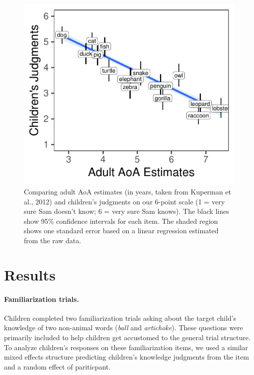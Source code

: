 \documentclass[10pt, letterpaper]{article}
\newenvironment{CodeChunk}{}{}
\begin{document}
\begin{CodeChunk}
\begin{figure}[tb]
\includegraphics{figs/overall-1} \caption[Comparing adult AoA estimates (in years, taken from Kuperman et al., 2012) and children’s judgments on our 6-point scale (1 = very sure Sam doesn’t know]{Comparing adult AoA estimates (in years, taken from Kuperman et al., 2012) and children’s judgments on our 6-point scale (1 = very sure Sam doesn’t know; 6 = very sure Sam knows). The black lines show 95\% confidence intervals for each item. The shaded region shows one standard error based on a linear regression estimated from the raw data.}\label{fig:overall}
\end{figure}
\end{CodeChunk}

\hypertarget{results}{%
\section{Results}\label{results}}

\hypertarget{familiarization-trials.}{%
\paragraph{Familiarization trials.}\label{familiarization-trials.}}

Children completed two familiarization trials asking about the target
child's knowledge of two non-animal words (\emph{ball} and
\emph{artichoke}). These questions were primarily included to help
children get accustomed to the general trial structure. To analyze
children's responses on these familiarization items, we used a similar
mixed effects structure predicting children's knowledge judgments from
the item and a random effect of pariticpant.
\end{document}
